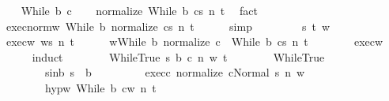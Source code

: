 \begin{isabellebody}
\isamarkupfalse%
\isanewline
\ \ \isamarkupfalse%
\ {\isacharparenleft}While\ b\ c{\isacharparenright}\isanewline
\ \ \isamarkupfalse%
\ {\isachardoublequoteopen}{\isasymGamma}{\isasymturnstile}{\isasymlangle}normalize\ {\isacharparenleft}While\ b\ c{\isacharparenright}{\isacharcomma}s{\isasymrangle}\ {\isacharequal}n{\isasymRightarrow}\ t{\isachardoublequoteclose}\ \isamarkupfalse%
\ fact\isanewline
\ \ \isamarkupfalse%
\ exec{\isacharunderscore}norm{\isacharunderscore}w{\isacharcolon}\ {\isachardoublequoteopen}{\isasymGamma}{\isasymturnstile}{\isasymlangle}While\ b\ {\isacharparenleft}normalize\ c{\isacharparenright}{\isacharcomma}s{\isasymrangle}\ {\isacharequal}n{\isasymRightarrow}\ t{\isachardoublequoteclose}\isanewline
\ \ \ \ \isamarkupfalse%
\ simp\isanewline
\ \ \isacommand{{\isacharbraceleft}}\isamarkupfalse%
\isanewline
\ \ \ \ \isamarkupfalse%
\ s\ t\ w\ \isanewline
\ \ \ \ \isamarkupfalse%
\ exec{\isacharunderscore}w{\isacharcolon}\ {\isachardoublequoteopen}{\isasymGamma}{\isasymturnstile}{\isasymlangle}w{\isacharcomma}s{\isasymrangle}\ {\isacharequal}n{\isasymRightarrow}\ t{\isachardoublequoteclose}\isanewline
\ \ \ \ \isamarkupfalse%
\ {\isachardoublequoteopen}w{\isacharequal}While\ b\ {\isacharparenleft}normalize\ c{\isacharparenright}\ {\isasymLongrightarrow}\ {\isasymGamma}{\isasymturnstile}{\isasymlangle}While\ b\ c{\isacharcomma}s{\isasymrangle}\ {\isacharequal}n{\isasymRightarrow}\ t{\isachardoublequoteclose}\isanewline
\ \ \ \ \ \ \isamarkupfalse%
\ exec{\isacharunderscore}w\ \isanewline
\ \ \ \ \isamarkupfalse%
\ {\isacharparenleft}induct{\isacharparenright}\isanewline
\ \ \ \ \ \ \isamarkupfalse%
\ {\isacharparenleft}WhileTrue\ s\ b{\isacharprime}\ c{\isacharprime}\ n\ w\ t{\isacharparenright}\isanewline
\ \ \ \ \ \ \isamarkupfalse%
\ WhileTrue\ \isamarkupfalse%
\ \isanewline
\ \ \ \ \ \ \ \ s{\isacharunderscore}in{\isacharunderscore}b{\isacharcolon}\ {\isachardoublequoteopen}s\ {\isasymin}\ b{\isachardoublequoteclose}\ \isanewline
\ \ \ \ \ \ \ \ exec{\isacharunderscore}c{\isacharcolon}\ {\isachardoublequoteopen}{\isasymGamma}{\isasymturnstile}{\isasymlangle}normalize\ c{\isacharcomma}Normal\ s{\isasymrangle}\ {\isacharequal}n{\isasymRightarrow}\ w{\isachardoublequoteclose}\ \isanewline
\ \ \ \ \ \ \ \ hyp{\isacharunderscore}w{\isacharcolon}\ {\isachardoublequoteopen}{\isasymGamma}{\isasymturnstile}{\isasymlangle}While\ b\ c{\isacharcomma}w{\isasymrangle}\ {\isacharequal}n{\isasymRightarrow}\ t{\isachardoublequoteclose}\isanewline

\end{isabellebody}
